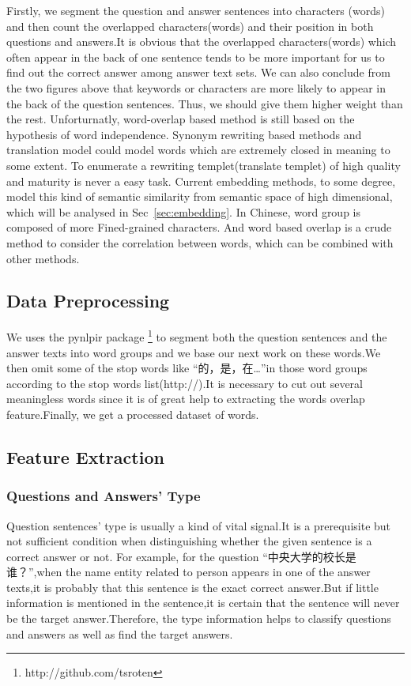 \documentclass{llncs}
\begin{document}
Firstly, we segment the question and answer sentences into characters (words) and then count the overlapped characters(words) and their position in both questions and answers.It is obvious that the overlapped characters(words) which often appear in the back of one sentence tends to be more important for us to find out the correct answer among answer text sets. We can also conclude from the two figures above that keywords or characters are more likely to appear in the back of the question sentences. Thus, we should give them higher weight than the rest.
Unforturnatly, word-overlap based method is still based on the hypothesis of word independence. Synonym rewriting based methods and translation model could model words which are extremely closed in meaning to some extent. To enumerate a rewriting templet(translate templet) of high quality and maturity is never a easy task. Current embedding methods, to some degree, model this kind of semantic similarity from semantic space of high dimensional, which will be analysed in Sec~\ref{sec:embedding}.
In Chinese, word group is composed of more Fined-grained characters. And word based overlap is a crude method to consider the correlation between words, which can be combined with other methods.


\subsection{Data Preprocessing}
\label{sec:preprocess}

We uses the pynlpir package \footnote{http://github.com/tsroten} to segment both the question sentences and the answer texts into word groups and we base our next work on these words.We then omit some of the stop words like “的，是，在…”in those word groups according to the stop words list(http://).It is necessary to cut out several meaningless words since it is of great help to extracting the words overlap feature.Finally, we get a processed dataset of words.



\subsection{Feature Extraction}
\label{sec:feature}

\subsubsection{Questions and Answers’ Type}
Question sentences’ type is usually a kind of vital signal.It is a prerequisite but not sufficient condition when distinguishing whether the given sentence is a correct answer or not. For example, for the question “中央大学的校长是谁？”,when the name entity related to person appears in one of the answer texts,it is probably that this sentence is the exact correct answer.But if little information is mentioned in the sentence,it is certain that the sentence will never be the target answer.Therefore, the type information helps to classify questions and answers as well as find the target answers. 
\end{document}
